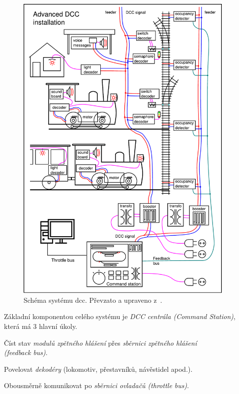 \begin{figure}[ht!]
\includegraphics[width=0.95\textwidth]{data/schema_dcc_en.pdf}
\caption{Schéma systému \gls{dcc}. Převzato a upraveno z~\cite{dcc_wikipedia:web}.}
\label{fig:dcc-overview}
\end{figure}

Základní komponentou celého systému je \textit{DCC centrála (Command Station)},
která má 3 hlavní úkoly.

\begin{compactenum}
\item Číst stav \textit{modulů zpětného hlášení} přes \textit{sběrnici zpětného hlášení \\
	(feedback bus)}.
\item Povelovat \textit{dekodéry} (lokomotiv, přestavníků, návěstidel apod.).
\item Obousměrně komunikovat po \textit{sběrnici ovladačů (throttle bus)}.
\end{compactenum}

